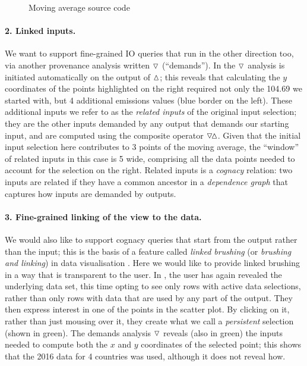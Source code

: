 \begin{figure}[t]
   \small
       {}
       \vspace{-0.5em}
   \caption{Moving average source code}
   \label{fig:example:moving-average:source}
\end{figure}

\paragraph{2. Linked inputs.}

We want to support fine-grained IO queries that run in the other direction too, via another provenance
analysis written $\triangledown$ (``demands''). In  the $\triangledown$ analysis
is initiated automatically on the output of $\demandedByR$; this reveals that calculating the $y$ coordinates
of the points highlighted on the right required not only the 104.69 we started with, but 4 additional
emissions values (blue border on the left). These additional inputs we refer to as the \emph{related inputs}
of the original input selection; they are the other inputs demanded by any output that demands our starting
input, and are computed using the composite operator $\relInputR$. Given that the initial input selection here
contributes to 3 points of the moving average, the ``window'' of related inputs in this case is 5 wide,
comprising all the data points needed to account for the selection on the right. Related inputs is a
\emph{cognacy} relation: two inputs are related if they have a common ancestor in a \emph{dependence graph}
that captures how inputs are demanded by outputs.

\paragraph{3. Fine-grained linking of the view to the data.}

We would also like to support cognacy queries that start from the output rather than the input; this is the
basis of a feature called \emph{linked brushing} (or \emph{brushing and linking}) in data visualisation
\cite{becker87,buja91}. Here we would like to provide linked brushing in a way that is transparent to the
user. In , the user has again revealed the underlying data set, this time
opting to see only rows with active data selections, rather than only rows with data that are used by any part
of the output. They then express interest in one of the points in the scatter plot. By clicking on it, rather
than just mousing over it, they create what we call a \emph{persistent} selection (shown in green).
The demands analysis $\triangledown$ reveals (also in green) the inputs needed to compute both the $x$ and $y$
coordinates of the selected point; this shows that the 2016 data for 4 countries was used, although it does
not reveal how.

